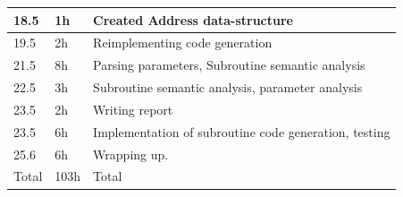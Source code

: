 \documentclass[12pt,a4paper]{article}
\begin{document}
\begin{center}
\begin{tabular}{l l l}
    \bottomrule
    18.5 & 1h & Created Address data-structure\\
    \bottomrule
    19.5 & 2h & Reimplementing code generation\\
    \bottomrule
    21.5 & 8h & Parsing parameters, Subroutine semantic analysis \\
    \bottomrule
    22.5 & 3h & Subroutine semantic analysis, parameter analysis\\
    \bottomrule
    23.5 & 2h & Writing report\\
    \bottomrule
    23.5 & 6h & Implementation of subroutine code generation, testing\\
    \bottomrule
    25.6 & 6h & Wrapping up. \\
    \bottomrule
    Total & 103h & Total
  \end{tabular}
\end{center}
\end{document}
